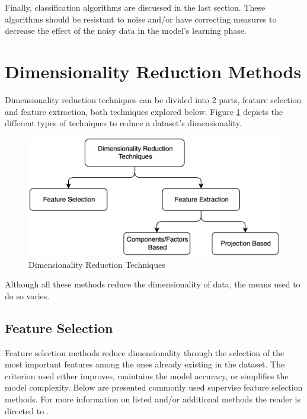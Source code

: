 \documentclass[12pt, english, openany]{book}
\begin{document}
Finally, classification algorithms are discussed in the last section. These
algorithms should be resistant to noise and/or have correcting measures to
decrease the effect of the noisy data in the model's learning phase.

\section{Dimensionality Reduction Methods}
Dimensionality reduction techniques can be divided into 2 parts, feature
selection and feature extraction, both techniques explored below. Figure
\ref{fig:dimensionality-reduction} depicts the different types of techniques to
reduce a dataset's dimensionality.

\begin{figure}[H]
	\centering
	\includegraphics[width=1\linewidth]{dimensionality_reduction.png}
  \caption{Dimensionality Reduction Techniques}
  \label{fig:dimensionality-reduction}
\end{figure}

Although all these methods reduce the dimensionality of data, the means used to
do so varies.

\subsection*{Feature Selection}

Feature selection methods reduce dimensionality through the selection of the
most important features among the ones already existing in the dataset. The
criterion used either improves, maintains the model accuracy, or simplifies the
model complexity. Below are presented commonly used supervise feature selection
methods. For more information on listed and/or additional methods the reader is
directed to \cite{Cai2018, Ghojogh2019}.
\end{document}
